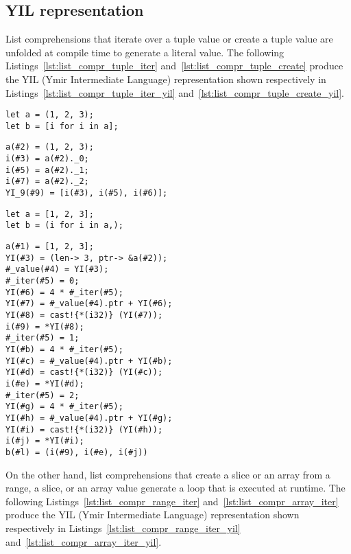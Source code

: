 \subsection {YIL representation}

List comprehensions that iterate over a tuple value or create a tuple value are
unfolded at compile time to generate a literal value. The following
Listings~\ref{lst:list_compr_tuple_iter} and~\ref{lst:list_compr_tuple_create}
produce the YIL (Ymir Intermediate Language) representation shown respectively
in Listings~\ref{lst:list_compr_tuple_iter_yil}
and~\ref{lst:list_compr_tuple_create_yil}.

\begin{lstlisting}[style=coloredverbatim, label=lst:list_compr_tuple_iter, caption=List comprehension iterating over a tuple]
let a = (1, 2, 3);
let b = [i for i in a];
\end{lstlisting}

\begin{lstlisting}[style=intermediateVerb, label=lst:list_compr_tuple_iter_yil, caption=YIL representation of Listing~\ref{lst:list_compr_tuple_iter}]
a(#2) = (1, 2, 3);
i(#3) = a(#2)._0;
i(#5) = a(#2)._1;
i(#7) = a(#2)._2;
YI_9(#9) = [i(#3), i(#5), i(#6)];
\end{lstlisting}

\begin{lstlisting}[style=coloredverbatim, label=lst:list_compr_tuple_create, caption=List comprehension iterating over a tuple]
let a = [1, 2, 3];
let b = (i for i in a,);
\end{lstlisting}

\begin{lstlisting}[style=intermediateVerb, label=lst:list_compr_tuple_create_yil, caption=YIL representation of Listing~\ref{lst:list_compr_tuple_iter}]
a(#1) = [1, 2, 3];
YI(#3) = (len-> 3, ptr-> &a(#2));
#_value(#4) = YI(#3);
#_iter(#5) = 0;
YI(#6) = 4 * #_iter(#5);
YI(#7) = #_value(#4).ptr + YI(#6);
YI(#8) = cast!{*(i32)} (YI(#7));
i(#9) = *YI(#8);
#_iter(#5) = 1;
YI(#b) = 4 * #_iter(#5);
YI(#c) = #_value(#4).ptr + YI(#b);
YI(#d) = cast!{*(i32)} (YI(#c));
i(#e) = *YI(#d);
#_iter(#5) = 2;
YI(#g) = 4 * #_iter(#5);
YI(#h) = #_value(#4).ptr + YI(#g);
YI(#i) = cast!{*(i32)} (YI(#h));
i(#j) = *YI(#i);
b(#l) = (i(#9), i(#e), i(#j))
\end{lstlisting}

On the other hand, list comprehensions that create a slice or an array from a
range, a slice, or an array value generate a loop that is executed at runtime.
The following Listings~\ref{lst:list_compr_range_iter}
and~\ref{lst:list_compr_array_iter} produce the YIL (Ymir Intermediate Language)
representation shown respectively in
Listings~\ref{lst:list_compr_range_iter_yil}
and~\ref{lst:list_compr_array_iter_yil}.


